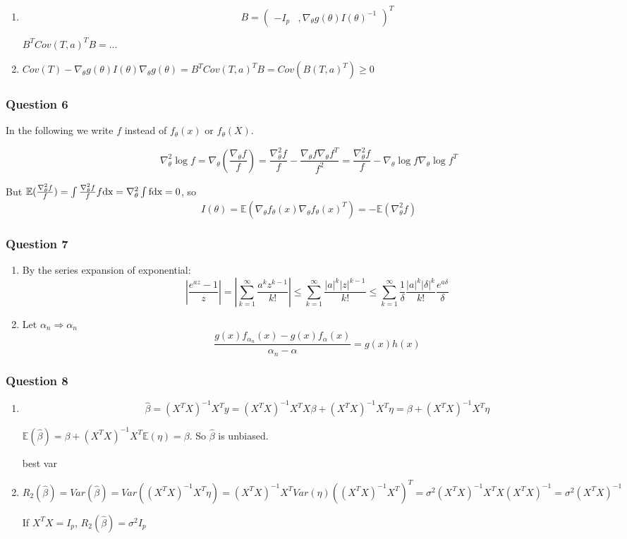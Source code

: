 \documentclass[12pt]{article}
\newcommand{\Q}[1]{\subsubsection*{Question #1}}
\newcommand{\Es}[1]{\mathbb{E}(#1)}
\begin{document}
\begin{enumerate}
\item
\[ B = \left(\begin{array}{cc}-I_p&,\nabla_\theta g(\theta) I(\theta)^{-1}\end{array}\right)^T \]

$B^T Cov(T, a)^T B = ...$


\item $Cov(T) - \nabla_\theta g(\theta)I(\theta) \nabla_\theta g(\theta)  = B^T Cov(T, a)^T B = Cov( B(T, a)^T ) \geq 0$
\end{enumerate}

\Q{6}

In the following we write $f$ instead of $f_\theta(x)$ or $f_\theta(X)$.


$$\nabla_\theta^2 \log f = \nabla_\theta (\frac{\nabla_\theta f}{f}) = \frac{\nabla_\theta^2 f}{f} - \frac{\nabla_\theta f \nabla_\theta f^T}{f^2} = \frac{\nabla_\theta^2 f}{f} - \nabla_\theta \log f \nabla_\theta \log f^T$$


But $\Es {\frac{\nabla_\theta^2 f}{f}} = \int \frac{\nabla_\theta^2 f}{f} f \rm d x 
= \nabla_\theta ^2 \int f \rm d x = 0$, so
$$
I(\theta) = \Es{\nabla_\theta f_{\theta}(x) \nabla_\theta f_{\theta}(x)^T}  = - \Es{ \nabla_{\theta}^2 f}
$$

\Q{7}
\begin{enumerate}

\item
By the series expansion of exponential:
$$|\frac{e^{az} - 1}{z}| = |\sum_{k=1}^{\infty} \frac{a^kz^{k-1}}{k!}|
\leq \sum_{k=1}^{\infty} \frac{|a|^k|z|^{k-1}}{k!}
\leq \sum_{k=1}^{\infty} \frac{1}{\delta} \frac{|a|^k|\delta|^{k}}{k!}
\frac{e^{a\delta}}{\delta} 
$$
\item
Let $\alpha_n \Rightarrow \alpha_n$
$$\frac{g(x)f_{\alpha_n}(x) - g(x) f_\alpha(x)}{\alpha_n - \alpha} 
= g(x)h(x)
 $$ 

\end{enumerate}

\Q{8}
\begin{enumerate}


\item 

$$\hat \beta = (X^TX)^{-1} X^T y  = (X^TX)^{-1} X^T X \beta + (X^TX)^{-1} X^T \eta = \beta + (X^TX)^{-1} X^T \eta$$

$\Es {\hat \beta} = \beta + (X^TX)^{-1} X^T \Es{\eta} = \beta$. So $\hat \beta$ is unbiased.

best var
\item $R_2(\hat \beta) = Var(\hat \beta) = Var((X^TX)^{-1} X^T \eta) = (X^TX)^{-1} X^T Var(\eta) ((X^TX)^{-1} X^T)^T = \sigma^2 (X^TX)^{-1} X^T X (X^TX)^{-1} = \sigma^2 (X^TX)^{-1}$

If $X^TX = I_p$, $R_2(\hat \beta) = \sigma^2 I_p$
\end{enumerate}
\end{document}
